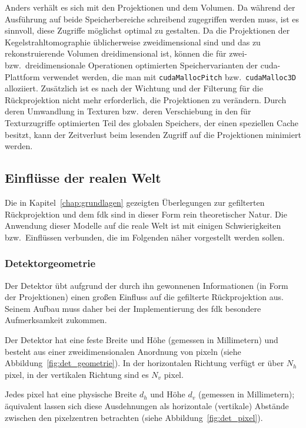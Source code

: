 Anders verhält es sich mit den Projektionen und dem Volumen. Da während der Ausführung auf beide Speicherbereiche
schreibend zugegriffen werden muss, ist es sinnvoll, diese Zugriffe möglichst optimal zu gestalten. Da die Projektionen
der Kegelstrahltomographie üblicherweise zweidimensional sind und das zu rekonstruierende Volumen dreidimensional ist,
können die für zwei- bzw.\ dreidimensionale Operationen optimierten Speichervarianten der \gls{cuda}-Plattform verwendet
werden, die man mit \texttt{cudaMallocPitch} bzw.\ \texttt{cudaMalloc3D} alloziiert. Zusätzlich ist es nach der Wichtung
und der Filterung für die Rückprojektion nicht mehr erforderlich, die Projektionen zu verändern. Durch deren Umwandlung
in Texturen bzw.\ deren Verschiebung in den für Texturzugriffe optimierten Teil des globalen Speichers, der einen
speziellen Cache besitzt, kann der Zeitverlust beim lesenden Zugriff auf die Projektionen minimiert werden.

\subsection{Einflüsse der realen Welt}

Die in Kapitel~\ref{chap:grundlagen} gezeigten Überlegungen zur gefilterten Rückprojektion und dem \gls{fdk} sind in
dieser Form rein theoretischer Natur. Die Anwendung dieser Modelle auf die reale Welt ist mit einigen Schwierigkeiten
bzw.\ Einflüssen verbunden, die im Folgenden näher vorgestellt werden sollen.

\subsubsection{Detektorgeometrie}

Der Detektor übt aufgrund der durch ihn gewonnenen Informationen (in Form der Projektionen) einen großen Einfluss auf
die gefilterte Rückprojektion aus. Seinem Aufbau muss daher bei der Implementierung des \gls{fdk} besondere
Aufmerksamkeit zukommen.

Der Detektor hat eine feste Breite und Höhe (gemessen in Millimetern) und besteht aus einer zweidimensionalen Anordnung
von \gls{pixel}n (siehe Abbildung~\ref{fig:det_geometrie}). In der horizontalen Richtung verfügt er über $N_h$
\gls{pixel}, in der vertikalen Richtung sind es $N_v$ \gls{pixel}.

Jedes \gls{pixel} hat eine physische Breite $d_h$ und Höhe $d_v$ (gemessen in Millimetern); äquivalent lassen sich diese
Ausdehnungen als horizontale (vertikale) Abstände zwischen den \gls{pixel}zentren betrachten (siehe
Abbildung~\ref{fig:det_pixel}).

